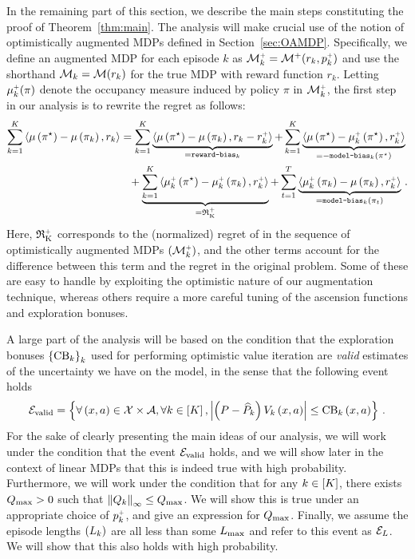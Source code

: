 In the remaining part of this section, we describe the main steps constituting the proof of Theorem~\ref{thm:main}. The analysis will make crucial use of the notion of optimistically augmented MDPs defined in Section~\ref{sec:OAMDP}. Specifically, we define an augmented MDP for each episode $k$ as $\mathcal{M}^{\mathsf{\scriptscriptstyle +}}_k = \mathcal{M}^+(r_k,p_k^{\mathsf{\scriptscriptstyle +}})$ and use the shorthand $\mathcal{M}_k = \mathcal{M}(r_k)$ for the true MDP with reward function $r_k$. Letting $\mu_k^{\mathsf{\scriptscriptstyle +}}(\pi)$ denote the occupancy measure induced by policy $\pi$ in $\mathcal{M}_k^{\mathsf{\scriptscriptstyle +}}$, the first step in our analysis is to rewrite the regret as follows:
%
\begin{align*}
    \sum_{k=1}^K \left\langle \mu \left( \pi^\star \right) - \mu \left( \pi_k \right), r_k \right\rangle &= \sum_{k=1}^K \underbrace{\left\langle \mu \left( \pi^\star \right) - \mu \left( \pi_k \right), r_k - r_k^{\mathsf{\scriptscriptstyle +}} \right\rangle}_{= \texttt{reward-bias}_k} + \sum_{k=1}^K \underbrace{\left\langle \mu \left( \pi^\star \right) - \mu_k^{\mathsf{\scriptscriptstyle +}} \left( \pi^\star \right), r_k^{\mathsf{\scriptscriptstyle +}} \right\rangle}_{= - \texttt{model-bias}_k \left( \pi^\star \right)} \\
    &\phantom{=}+ \underbrace{\sum_{k=1}^K \left\langle \mu_k^{\mathsf{\scriptscriptstyle +}} \left( \pi^\star \right) - \mu_k^{\mathsf{\scriptscriptstyle +}} \left( \pi_k \right), r_k^{\mathsf{\scriptscriptstyle +}} \right\rangle}_{= \operatorname{\mathfrak{R}_K^\mathsf{\scriptscriptstyle +}}} + \sum_{t=1}^T \underbrace{\left\langle \mu_k^{\mathsf{\scriptscriptstyle +}} \left( \pi_k \right) - \mu \left( \pi_k \right), r_k^{\mathsf{\scriptscriptstyle +}} \right\rangle}_{= \texttt{model-bias}_k \left( \pi_t \right)}\,.
\end{align*}
%
Here, $\operatorname{\mathfrak{R}_K^\mathsf{\scriptscriptstyle +}}$ corresponds to the (normalized) regret of \raviUCB in the sequence of optimistically augmented MDPs $\left(\mathcal{M}_k^{\mathsf{\scriptscriptstyle +}}\right)$, and the other terms account for the difference between this term and the regret in the original problem. Some of these are easy to handle by exploiting the optimistic nature of our augmentation technique, whereas others require a more careful tuning of the ascension functions and exploration bonuses.

A large part of the analysis will be based on the condition that the exploration bonuses $\left\{ \operatorname{CB}_k \right\}_k$ used for performing optimistic value iteration are \emph{valid} estimates of the uncertainty we have on the model, in the sense that the following event holds
%
\begin{equation} \label{eq:validity-bonuses}
    \mathcal{E}_{\text{valid}} = \left\{ \forall \left( x, a \right) \in \mathcal{X} \times \mathcal{A}, \forall k \in \left[ K \right], \left|\left( P - \widehat{P}_k \right) V_k \left( x, a \right)\right| \leq \operatorname{CB}_k \left( x, a \right) \right\}\,.
\end{equation}
%
For the sake of clearly presenting the main ideas of our analysis, we will work under the condition that the event $\mathcal{E}_{\text{valid}}$ holds, and we will show later in the context of linear MDPs that this is indeed true with high probability. Furthermore, we will work under the condition that for any $k \in \left[ K \right]$, there exists $Q_{\max} > 0$ such that $\left\|Q_k\right\|_\infty \leq Q_{\max}$. We will show this is true under an appropriate choice of $p_k^{\mathsf{\scriptscriptstyle +}}$, and give an expression for $Q_{\max}$. Finally, we assume the episode lengths $\left( L_k \right)$ are all less than some $L_{\max}$ and refer to this event as $\mathcal{E}_L$. We will show that this also holds with high probability.


